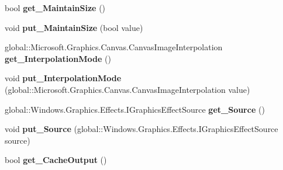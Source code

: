 \begin{DoxyCompactItemize}
bool {\bfseries get\+\_\+\+Maintain\+Size} ()
\item 
\mbox{\label{class_microsoft_1_1_graphics_1_1_canvas_1_1_effects_1_1_straighten_effect_aeebcec8cdc0176631d083ffd75d72763}} 
void {\bfseries put\+\_\+\+Maintain\+Size} (bool value)
\item 
\mbox{\label{class_microsoft_1_1_graphics_1_1_canvas_1_1_effects_1_1_straighten_effect_ad23e6c9cc37bdaff9615259972c047d6}} 
global\+::\+Microsoft.\+Graphics.\+Canvas.\+Canvas\+Image\+Interpolation {\bfseries get\+\_\+\+Interpolation\+Mode} ()
\item 
\mbox{\label{class_microsoft_1_1_graphics_1_1_canvas_1_1_effects_1_1_straighten_effect_acf34cd5322f264253235a1dcaa442ba8}} 
void {\bfseries put\+\_\+\+Interpolation\+Mode} (global\+::\+Microsoft.\+Graphics.\+Canvas.\+Canvas\+Image\+Interpolation value)
\item 
\mbox{\label{class_microsoft_1_1_graphics_1_1_canvas_1_1_effects_1_1_straighten_effect_afc5cddafd3cf6b76344d67cd56c344ce}} 
global\+::\+Windows.\+Graphics.\+Effects.\+I\+Graphics\+Effect\+Source {\bfseries get\+\_\+\+Source} ()
\item 
\mbox{\label{class_microsoft_1_1_graphics_1_1_canvas_1_1_effects_1_1_straighten_effect_a7b9aaa626d56da821740097951cd1c38}} 
void {\bfseries put\+\_\+\+Source} (global\+::\+Windows.\+Graphics.\+Effects.\+I\+Graphics\+Effect\+Source source)
\item 
\mbox{\label{class_microsoft_1_1_graphics_1_1_canvas_1_1_effects_1_1_straighten_effect_aa6bcc6219eb494a9aaa6dff927bbf52f}} 
bool {\bfseries get\+\_\+\+Cache\+Output} ()
\item 
\mbox{\label{class_microsoft_1_1_graphics_1_1_canvas_1_1_effects_1_1_straighten_effect_a08dc50002bd2d57a463a37c9e3974833}} 

\end{DoxyCompactItemize}
